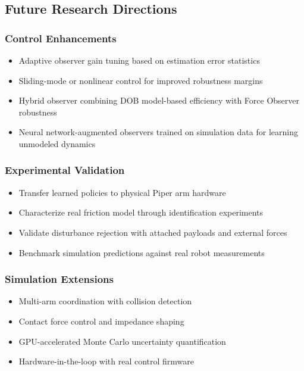 \subsection{Future Research Directions}

\subsubsection{Control Enhancements}
\begin{itemize}
    \item Adaptive observer gain tuning based on estimation error statistics
    \item Sliding-mode or nonlinear control for improved robustness margins
    \item Hybrid observer combining DOB model-based efficiency with Force Observer robustness
    \item Neural network-augmented observers trained on simulation data for learning unmodeled dynamics
\end{itemize}

\subsubsection{Experimental Validation}
\begin{itemize}
    \item Transfer learned policies to physical Piper arm hardware
    \item Characterize real friction model through identification experiments
    \item Validate disturbance rejection with attached payloads and external forces
    \item Benchmark simulation predictions against real robot measurements
\end{itemize}

\subsubsection{Simulation Extensions}
\begin{itemize}
    \item Multi-arm coordination with collision detection
    \item Contact force control and impedance shaping
    \item GPU-accelerated Monte Carlo uncertainty quantification
    \item Hardware-in-the-loop with real control firmware
\end{itemize}

